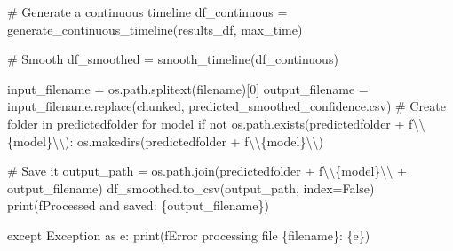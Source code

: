 \documentclass[
  letterpaper,
  DIV=11,
  numbers=noendperiod]{scrreprt}
\newenvironment{Shaded}{\begin{snugshade}}{\end{snugshade}}
\newcommand{\BuiltInTok}[1]{\textcolor[rgb]{0.00,0.23,0.31}{#1}}
\newcommand{\CharTok}[1]{\textcolor[rgb]{0.13,0.47,0.30}{#1}}
\newcommand{\CommentTok}[1]{\textcolor[rgb]{0.37,0.37,0.37}{#1}}
\newcommand{\ControlFlowTok}[1]{\textcolor[rgb]{0.00,0.23,0.31}{#1}}
\newcommand{\DecValTok}[1]{\textcolor[rgb]{0.68,0.00,0.00}{#1}}
\newcommand{\ImportTok}[1]{\textcolor[rgb]{0.00,0.46,0.62}{#1}}
\newcommand{\KeywordTok}[1]{\textcolor[rgb]{0.00,0.23,0.31}{#1}}
\newcommand{\NormalTok}[1]{\textcolor[rgb]{0.00,0.23,0.31}{#1}}
\newcommand{\OperatorTok}[1]{\textcolor[rgb]{0.37,0.37,0.37}{#1}}
\newcommand{\PreprocessorTok}[1]{\textcolor[rgb]{0.68,0.00,0.00}{#1}}
\newcommand{\SpecialCharTok}[1]{\textcolor[rgb]{0.37,0.37,0.37}{#1}}
\newcommand{\SpecialStringTok}[1]{\textcolor[rgb]{0.13,0.47,0.30}{#1}}
\newcommand{\StringTok}[1]{\textcolor[rgb]{0.13,0.47,0.30}{#1}}
\newcommand{\VariableTok}[1]{\textcolor[rgb]{0.07,0.07,0.07}{#1}}
\begin{document}
\begin{Shaded}
\begin{Highlighting}[]
                \CommentTok{\# Generate a continuous timeline}
\NormalTok{                df\_continuous }\OperatorTok{=}\NormalTok{ generate\_continuous\_timeline(results\_df, max\_time)}

                \CommentTok{\# Smooth}
\NormalTok{                df\_smoothed }\OperatorTok{=}\NormalTok{ smooth\_timeline(df\_continuous)}

\NormalTok{                input\_filename }\OperatorTok{=}\NormalTok{ os.path.splitext(filename)[}\DecValTok{0}\NormalTok{]}
\NormalTok{                output\_filename }\OperatorTok{=}\NormalTok{ input\_filename.replace(}\StringTok{\textquotesingle{}chunked\textquotesingle{}}\NormalTok{, }\StringTok{\textquotesingle{}predicted\_smoothed\_confidence.csv\textquotesingle{}}\NormalTok{)}
                \CommentTok{\# Create folder in predictedfolder for model}
                \ControlFlowTok{if} \KeywordTok{not}\NormalTok{ os.path.exists(predictedfolder }\OperatorTok{+} \SpecialStringTok{f\textquotesingle{}}\CharTok{\textbackslash{}\textbackslash{}}\SpecialCharTok{\{}\NormalTok{model}\SpecialCharTok{\}}\CharTok{\textbackslash{}\textbackslash{}}\SpecialStringTok{\textquotesingle{}}\NormalTok{):}
\NormalTok{                    os.makedirs(predictedfolder }\OperatorTok{+} \SpecialStringTok{f\textquotesingle{}}\CharTok{\textbackslash{}\textbackslash{}}\SpecialCharTok{\{}\NormalTok{model}\SpecialCharTok{\}}\CharTok{\textbackslash{}\textbackslash{}}\SpecialStringTok{\textquotesingle{}}\NormalTok{)}
                
                \CommentTok{\# Save it}
\NormalTok{                output\_path }\OperatorTok{=}\NormalTok{ os.path.join(predictedfolder }\OperatorTok{+} \SpecialStringTok{f\textquotesingle{}}\CharTok{\textbackslash{}\textbackslash{}}\SpecialCharTok{\{}\NormalTok{model}\SpecialCharTok{\}}\CharTok{\textbackslash{}\textbackslash{}}\SpecialStringTok{\textquotesingle{}} \OperatorTok{+}\NormalTok{ output\_filename)}
\NormalTok{                df\_smoothed.to\_csv(output\_path, index}\OperatorTok{=}\VariableTok{False}\NormalTok{)}
                \BuiltInTok{print}\NormalTok{(}\SpecialStringTok{f\textquotesingle{}Processed and saved: }\SpecialCharTok{\{}\NormalTok{output\_filename}\SpecialCharTok{\}}\SpecialStringTok{\textquotesingle{}}\NormalTok{)}

            \ControlFlowTok{except} \PreprocessorTok{Exception} \ImportTok{as}\NormalTok{ e:}
                \BuiltInTok{print}\NormalTok{(}\SpecialStringTok{f\textquotesingle{}Error processing file }\SpecialCharTok{\{}\NormalTok{filename}\SpecialCharTok{\}}\SpecialStringTok{: }\SpecialCharTok{\{}\NormalTok{e}\SpecialCharTok{\}}\SpecialStringTok{\textquotesingle{}}\NormalTok{)}
\end{Highlighting}
\end{Shaded}
\end{document}

